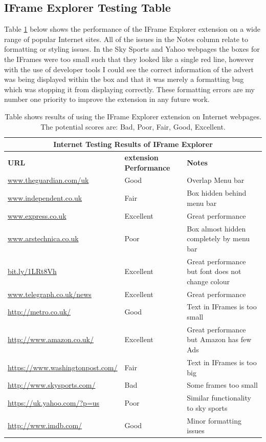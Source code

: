 \documentclass[12pt]{article}
\begin{document}
\subsection{IFrame Explorer Testing Table}  \label{iETesting}
Table \ref{table:4} below shows the performance of the IFrame Explorer extension on a wide range of popular Internet sites. All of the issues in the Notes column relate to formatting or styling issues. In the Sky Sports and Yahoo webpages the boxes for the IFrames were too small such that they looked like a single red line, however with the use of developer tools I could see the correct information of the advert was being displayed within the box and that it was merely a formatting bug which was stopping it from displaying correctly. These formatting errors are my number one priority to improve the extension in any future work. 

{
\begin{table} [H]
\centering
\begin{tabular}{ |p{5cm}|p{5cm}|p{5cm}|  }
\hline
\multicolumn{3}{|c|}{\textbf{Internet Testing Results of IFrame Explorer}} \\
\hline
\textbf{URL} & \textbf{extension Performance} & \textbf{Notes} \\
\hline
\url{www.theguardian.com/uk} & Good & Overlap Menu bar \\
\hline
\url{www.independent.co.uk} & Fair & Box hidden behind menu bar \\
\hline
\url{www.express.co.uk} & Excellent & Great performance \\
\hline
\url{www.arstechnica.co.uk} & Poor & Box almost hidden completely by menu bar  \\
\hline
\url{bit.ly/1LRt8Vh} & Excellent & Great performance but font does not change colour \\
\hline
\url{www.telegraph.co.uk/news} & Excellent & Great performance   \\
\hline
\url{http://metro.co.uk/} & Good & Text in IFrames is too small \\
\hline
\url{http://www.amazon.co.uk/} & Excellent & Great performance but Amazon has few Ads  \\
\hline
\url{https://www.washingtonpost.com/} & Fair & Text in IFrames is too big \\
\hline
\url{http://www.skysports.com/} & Bad & Some frames too small \\
\hline
\url{https://uk.yahoo.com/?p=us} & Poor & Similar functionality to sky sports \\
\hline
\url{http://www.imdb.com/} & Good & Minor formatting issues \\
\hline
\end{tabular}
\caption{Table shows results of using the IFrame Explorer extension on Internet webpages. The potential scores are: Bad, Poor, Fair, Good, Excellent.}
\label{table:4}
\end{table}
}
\end{document}

